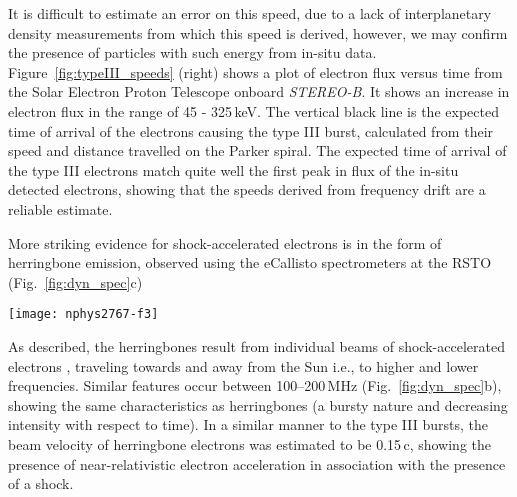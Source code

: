 It is difficult to estimate an error on this speed, due to a lack of interplanetary density measurements from which this speed is derived, however, we may confirm the presence of particles with such energy from in-situ data. Figure~\ref{fig:typeIII_speeds} (right) shows a plot of electron flux versus time from the Solar Electron Proton Telescope \citep[SEPT;][]{muller2008} onboard \emph{STEREO-B}. It shows an increase in electron flux in the range of 45 - 325\,keV. The vertical black line is the expected time of arrival of the electrons causing the type III burst, calculated from their speed and distance travelled on the Parker spiral. The expected time of arrival of the type III electrons match quite well the first peak in flux of the in-situ detected electrons, showing that the speeds derived from frequency drift are a reliable estimate. 

More striking evidence for shock-accelerated electrons is in the form of herringbone emission, observed using the eCallisto spectrometers at the RSTO (Fig.~\ref{fig:dyn_spec}c)

\begin{sidewaysfigure}[!t]
    \centering
\texttt{[image: nphys2767-f3]}
\caption[Radio dynamic spectra of 22-September-2011 event]{Radio dynamic spectra from STEREO-B/WAVES (0.01--16\,MHz), Nan\c{c}ay DA (20--90\,MHz), and RSTO eCallisto (10--400\,MHz) - \citep{carley2013}. The type II radio burst is indicated in {\bf b}, with both fundamental and harmonic emission observable. This shock signature is characterized by two emission bands drifting slowly ($\sim$-0.2\,MHz\,s$^{-1}$) toward lower frequency over time. The type III bursts are indicated in {\bf a},{\bf b}, while herringbones are shown in {\bf c}. Each herringbone is indicative of an electron beam traveling away from the shock. Note that all of the radio activity from {\bf a-c} is indicative of either particle acceleration or a plasma shock in the corona. The start and stop times of this radio activity in these dynamic spectra show good temporal correspondence with the start/stop times of the activity in Figure~\ref{fig:figure_aia_nrh_c2}. This is especially apparent for the features between 100--200\,MHz.}
\label{fig:dyn_spec}
\end{sidewaysfigure}
\clearpage


\noindent
As described, the herringbones result from individual beams of shock-accelerated electrons \citep{mann2005}, traveling towards and away from the Sun  i.e., to higher and lower frequencies. Similar features occur between 100--200\,MHz (Fig.~\ref{fig:dyn_spec}b), showing the same characteristics as herringbones (a bursty nature and decreasing intensity with respect to time). In a similar manner to the type III bursts, the beam velocity of herringbone electrons was estimated to be 0.15\,c, showing the presence of near-relativistic electron acceleration in association with the presence of a shock. 


